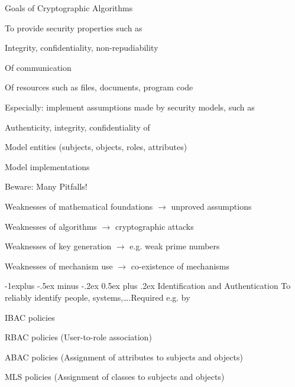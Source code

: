 \documentclass[a4paper]{article}
\makeatletter
\renewcommand{\subsection}{\@startsection{subsection}{2}{0mm}%
                {-1explus -.5ex minus -.2ex}%
                {0.5ex plus .2ex}%
                {\normalfont\normalsize\bfseries}}
\makeatother
\begin{document}
\begin{multicols}{3}
    Goals of Cryptographic Algorithms
    \begin{itemize*}
        \item To provide security properties such as
        \begin{itemize*}
            \item Integrity, confidentiality, non-repudiability
            \item Of communication
            \item Of resources such as files, documents, program code
        \end{itemize*}
        \item Especially: implement assumptions made by security models, such as
        \begin{itemize*}
            \item Authenticity, integrity, confidentiality of
            \item Model entities (subjects, objects, roles, attributes)
            \item Model implementations
        \end{itemize*}
    \end{itemize*}

    Beware: Many Pitfalls!
    \begin{itemize*}
        \item Weaknesses of mathematical foundations $\rightarrow$ unproved assumptions
        \item Weaknesses of algorithms $\rightarrow$ cryptographic attacks
        \item Weaknesses of key generation $\rightarrow$ e.g. weak prime numbers
        \item Weaknesses of mechanism use $\rightarrow$ co-existence of mechanisms
    \end{itemize*}

    \subsection{Identification and Authentication}
    To reliably identify people, systems,\dots .Required e.g. by
    \begin{itemize*}
        \item IBAC policies
        \item RBAC policies (User-to-role association)
        \item ABAC policies (Assignment of attributes to subjects and objects)
        \item MLS policies (Assignment of classes to subjects and objects)
    \end{itemize*}


\end{multicols}
\end{document}
